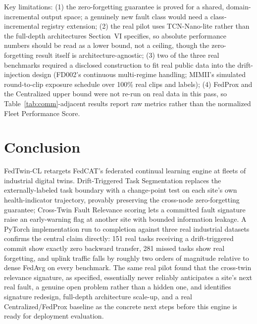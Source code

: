 \documentclass[journal]{IEEEtran}
\begin{document}
Key limitations: (1) the zero-forgetting guarantee is proved for a shared, domain-incremental output space; a genuinely new fault class would need a class-incremental registry extension; (2) the real pilot uses TCN-Nano-lite rather than the full-depth architectures Section~VI specifies, so absolute performance numbers should be read as a lower bound, not a ceiling, though the zero-forgetting result itself is architecture-agnostic; (3) two of the three real benchmarks required a disclosed construction to fit real public data into the drift-injection design (FD002's continuous multi-regime handling; MIMII's simulated round-to-clip exposure schedule over 100\% real clips and labels); (4) FedProx and the Centralized upper bound were not re-run on real data in this pass, so Table~\ref{tab:comm}-adjacent results report raw metrics rather than the normalized Fleet Performance Score.

\section{Conclusion}

FedTwin-CL retargets FedCAT's federated continual learning engine at fleets of industrial digital twins. Drift-Triggered Task Segmentation replaces the externally-labeled task boundary with a change-point test on each site's own health-indicator trajectory, provably preserving the cross-node zero-forgetting guarantee; Cross-Twin Fault Relevance scoring lets a committed fault signature raise an early-warning flag at another site with bounded information leakage. A PyTorch implementation run to completion against three real industrial datasets confirms the central claim directly: 151 real tasks receiving a drift-triggered commit show exactly zero backward transfer, 281 missed tasks show real forgetting, and uplink traffic falls by roughly two orders of magnitude relative to dense FedAvg on every benchmark. The same real pilot found that the cross-twin relevance signature, as specified, essentially never reliably anticipates a site's next real fault, a genuine open problem rather than a hidden one, and identifies signature redesign, full-depth architecture scale-up, and a real Centralized/FedProx baseline as the concrete next steps before this engine is ready for deployment evaluation.
\end{document}
